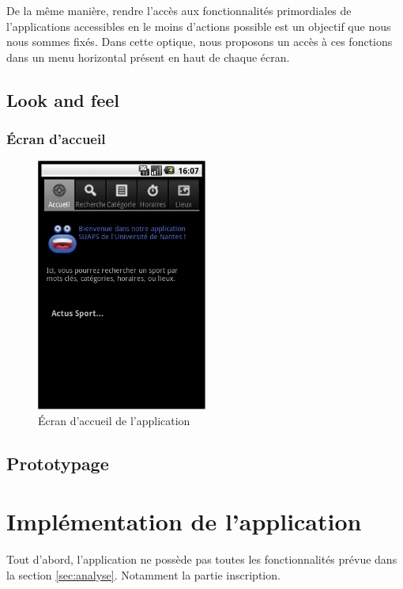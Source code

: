 \documentclass{article}
\begin{document}
	De la même manière, rendre l'accès aux fonctionnalités primordiales de
	l'applications accessibles en le moins d'actions possible est un objectif que
	nous nous sommes fixés.
	Dans cette optique, nous proposons un accès à ces fonctions dans un menu
	horizontal présent en haut de chaque écran.

	\subsection{Look and feel}

		\subsubsection{Écran d'accueil}

		\begin{figure}[ht]
			\centering
				\includegraphics[width=0.5\textwidth]{accueil.png}
				\caption{Écran d'accueil de l'application}
			\label{fig:allocine}
			\end{figure}

			



	\subsection{Prototypage}

\section{Implémentation de l'application}

    Tout d'abord, l'application ne possède pas toutes les fonctionnalités prévue
    dans la section \ref{sec:analyse}. Notamment la partie inscription.
\end{document}

